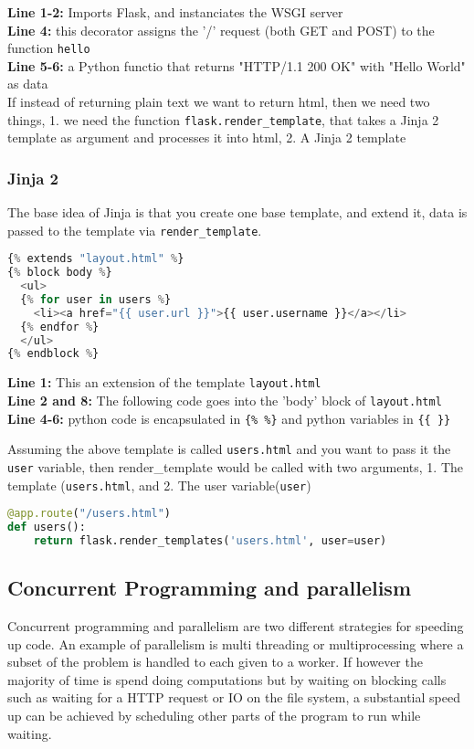 \documentclass[]{report}   %
\begin{document}
\textbf{Line 1-2:} Imports Flask, and instanciates the WSGI server \\
\textbf{Line 4:} this decorator assigns the '/' request (both GET and POST) to
the function \texttt{hello} \\
\textbf{Line 5-6:} a Python functio that returns "HTTP/1.1 200 OK" with "Hello
World" as data \\

If instead of returning plain text we want to return html, then we need two
things, 1. we need the function \texttt{flask.render\_template}, that takes a Jinja 2 template as argument and processes it into html, 2. A Jinja 2 template

\subsubsection{Jinja 2}
The base idea of Jinja is that you create one base template, and extend it,
data is passed to the template via \texttt{render\_template}. 


\begin{lstlisting}[language=python]
{% extends "layout.html" %}
{% block body %}
  <ul>
  {% for user in users %}
    <li><a href="{{ user.url }}">{{ user.username }}</a></li>
  {% endfor %}
  </ul>
{% endblock %}
\end{lstlisting}

\textbf{Line 1:} This an extension of the template \texttt{layout.html} \\
\textbf{Line 2 and 8:} The following code goes into the 'body' block of
\texttt{layout.html} \\
\textbf{Line 4-6:} python code is encapsulated in \texttt{\{\% \%\}} and python
variables in \texttt{\{\{ \}\}}

Assuming the above template is called \texttt{users.html} and you want to pass
it the \texttt{user} variable, then render\_template would be called with two
arguments, 1. The template (\texttt{users.html}, and 2. The user
variable(\texttt{user})

\begin{lstlisting}[language=python]
@app.route("/users.html")
def users():
    return flask.render_templates('users.html', user=user)
\end{lstlisting}


\subsection{Concurrent Programming and parallelism}
Concurrent programming and parallelism are two different strategies for
speeding up code. An example of parallelism is multi threading or
multiprocessing where a subset of the problem is handled to each given to a
worker. If however the majority of time is spend doing computations but by
waiting on blocking calls such as waiting for a HTTP request or IO on the file
system, a substantial speed up can be achieved by scheduling other parts of the
program to run while waiting.
\end{document}
